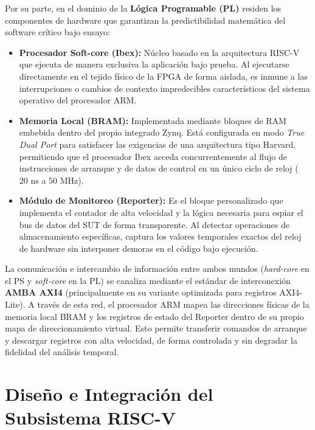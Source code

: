 Por su parte, en el dominio de la \textbf{Lógica Programable (PL)} residen los componentes de hardware que garantizan la predictibilidad matemática del software crítico bajo ensayo:
\begin{itemize}
    \item \textbf{Procesador Soft-core (Ibex):} Núcleo basado en la arquitectura RISC-V que ejecuta de manera exclusiva la aplicación bajo prueba. Al ejecutarse directamente en el tejido físico de la FPGA de forma aislada, es inmune a las interrupciones o cambios de contexto impredecibles característicos del sistema operativo del procesador ARM.
    \item \textbf{Memoria Local (BRAM):} Implementada mediante bloques de RAM embebida dentro del propio integrado Zynq. Está configurada en modo \textit{True Dual Port} para satisfacer las exigencias de una arquitectura tipo Harvard, permitiendo que el procesador Ibex acceda concurrentemente al flujo de instrucciones de arranque y de datos de control en un único ciclo de reloj ($20\text{ ns}$ a $50\text{ MHz}$).
    \item \textbf{Módulo de Monitoreo (Reporter):} Es el bloque personalizado que implementa el contador de alta velocidad y la lógica necesaria para espiar el bus de datos del SUT de forma transparente. Al detectar operaciones de almacenamiento específicas, captura los valores temporales exactos del reloj de hardware sin interponer demoras en el código bajo ejecución.
\end{itemize}

La comunicación e intercambio de información entre ambos mundos (\textit{hard-core} en el PS y \textit{soft-core} en la PL) se canaliza mediante el estándar de interconexión \textbf{AMBA AXI4} (principalmente en su variante optimizada para registros AXI4-Lite). A través de esta red, el procesador ARM mapea las direcciones físicas de la memoria local BRAM y los registros de estado del Reporter dentro de su propio mapa de direccionamiento virtual. Esto permite transferir comandos de arranque y descargar registros con alta velocidad, de forma controlada y sin degradar la fidelidad del análisis temporal.
\section{Diseño e Integración del Subsistema RISC-V}

